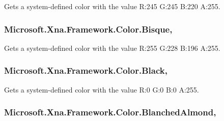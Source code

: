 Gets a system-\/defined color with the value R\+:245 G\+:245 B\+:220 A\+:255.

\hypertarget{struct_microsoft_1_1_xna_1_1_framework_1_1_color_a8b38892d4390e31b1665820b3d8955ad}{}
\subsubsection[{Bisque}]{ Microsoft.\+Xna.\+Framework.\+Color.\+Bisque\hspace{0.3cm}{\ttfamily [static]}, {\ttfamily [get]}}\label{struct_microsoft_1_1_xna_1_1_framework_1_1_color_a8b38892d4390e31b1665820b3d8955ad}


Gets a system-\/defined color with the value R\+:255 G\+:228 B\+:196 A\+:255.

\hypertarget{struct_microsoft_1_1_xna_1_1_framework_1_1_color_a3254bfc1043f3544ef9ab17b7c0b7160}{}
\subsubsection[{Black}]{ Microsoft.\+Xna.\+Framework.\+Color.\+Black\hspace{0.3cm}{\ttfamily [static]}, {\ttfamily [get]}}\label{struct_microsoft_1_1_xna_1_1_framework_1_1_color_a3254bfc1043f3544ef9ab17b7c0b7160}


Gets a system-\/defined color with the value R\+:0 G\+:0 B\+:0 A\+:255.

\hypertarget{struct_microsoft_1_1_xna_1_1_framework_1_1_color_a9f746fe2681a20f9a18745a0e1e49d91}{}
\subsubsection[{Blanched\+Almond}]{ Microsoft.\+Xna.\+Framework.\+Color.\+Blanched\+Almond\hspace{0.3cm}{\ttfamily [static]}, {\ttfamily [get]}}\label{struct_microsoft_1_1_xna_1_1_framework_1_1_color_a9f746fe2681a20f9a18745a0e1e49d91}


